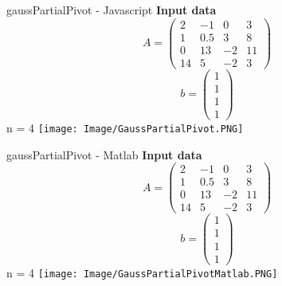 \documentclass{article}
\begin{document}
\begin{section}{gaussPartialPivot - Javascript}
   \textbf{Input data}\newline
    \[A=\begin{pmatrix}
        2 & -1 & 0 & 3\\
        1 & 0.5 & 3 & 8\\
        0 & 13 & -2 & 11\\
        14 & 5 & -2 & 3
    \end{pmatrix}\]
    \[b=\begin{pmatrix}
        1\\
        1\\
        1\\
        1
    \end{pmatrix}\]
    n = 4\newline\newline
    \texttt{[image: Image/GaussPartialPivot.PNG]}
\end{section}
\begin{section}{gaussPartialPivot - Matlab}
   \textbf{Input data}\newline
    \[A=\begin{pmatrix}
        2 & -1 & 0 & 3\\
        1 & 0.5 & 3 & 8\\
        0 & 13 & -2 & 11\\
        14 & 5 & -2 & 3
    \end{pmatrix}\]
    \[b=\begin{pmatrix}
        1\\
        1\\
        1\\
        1
    \end{pmatrix}\]
    n = 4\newline\newline
    \texttt{[image: Image/GaussPartialPivotMatlab.PNG]}
\end{section}
\end{document}
